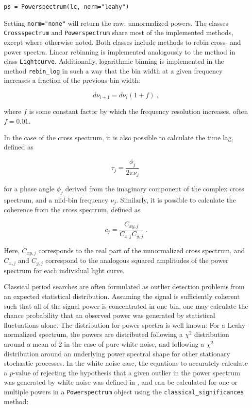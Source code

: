 \documentclass[12pt]{emulateapj}
\newcommand{\lightcurve}{\texttt{Lightcurve}\xspace}
\newcommand{\crossspectrum}{\texttt{Crossspectrum}\xspace}
\newcommand{\powerspectrum}{\texttt{Powerspectrum}\xspace}
\begin{document}
\begin{verbatim}
ps = Powerspectrum(lc, norm="leahy")
\end{verbatim}

\noindent Setting \texttt{norm="none"} will return the raw, unnormalized powers. The classes \crossspectrum and \powerspectrum share most of the implemented methods, except where otherwise noted. Both classes include methods to rebin cross- and power spectra. Linear rebinning is implemented analogously to the method in class \lightcurve. Additionally, logarithmic binning is implemented in the method \texttt{rebin_log} in such a way that the bin width at a given frequency increases a fraction of the previous bin width:

\[
d\nu_{i+1} = d\nu_{i} (1 + f) \; ,
\]

\noindent where $f$ is some constant factor by which the frequency resolution increases, often $f = 0.01$. 

In the case of the cross spectrum, it is also possible to calculate the time lag, defined as

\[
\tau_j = \frac{\phi_j}{2\pi\nu_j} \; 
\]

\noindent for a phase angle $\phi_j$ derived from the imaginary component of the complex cross spectrum, and a mid-bin frequency $\nu_j$. Similarly, it is possible to calculate the coherence \citep{vaughan1997,nowak1999} from the cross spectrum, defined as 

\begin{equation}
c_j = \frac{C_{xy,j}}{C_{x,j} C_{y,j}} \; . 
\end{equation}

\noindent Here, $C_{xy,j}$ corresponds to the real part of the unnormalized cross spectrum, and $C_{x,j}$ and $C_{y,j}$ correspond to the analogous squared amplitudes of the power spectrum for each individual light curve. 

Classical period searches are often formulated as outlier detection problems from an expected statistical distribution. Assuming the signal is sufficiently coherent such that all of the signal power is concentrated in one bin, one may calculate the chance probability that an observed power was generated by statistical fluctuations alone. The distribution for power spectra is well known: For a Leahy-normalized spectrum, the powers are distributed following a $\chi^2$ distribution around a mean of $2$ in the case of pure white noise, and following a $\chi^2$ distribution around an underlying power spectral shape for other stationary stochastic processes. In the white noise case, the equations to accurately calculate a $p$-value of rejecting the hypothesis that a given outlier in the power spectrum was generated by white noise was defined in \citep{Groth1975}, and can be calculated for one or multiple powers in a \powerspectrum object using the \verb|classical_significances| method:
\end{document}
